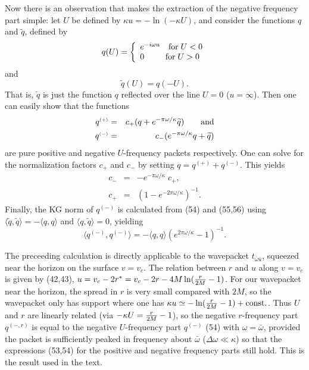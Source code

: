 \documentclass[12pt]{article}
\def\o{\omega}
\def\obar{\bar{\omega}}
\def\ubar{\bar{u}}
\def\la{\langle}
\def\ra{\rangle}
\begin{document}
Now there is an observation \cite{Notes,Wald75} that makes the
extraction of the negative frequency part simple: let
$U$ be defined by $\kappa u=-\ln(-\kappa U)$, and consider
the functions $q$ and $\widetilde q$, defined by
\begin{equation}
q(U)=\left\{
\begin{array}{l}
e^{-i\omega u} \quad {\rm for}\;  U<0\\
0\quad\quad\; \; {\rm for}\;  U>0
\end{array}\right.
\end{equation}
and
\begin{equation}\widetilde{q}(U)=q(-U).
\end{equation}
That is, $\widetilde q$ is just the function $q$ reflected over
the line $U=0$ ($u=\infty$). Then one can easily show that
the functions
\begin{eqnarray}
q^{\scriptscriptstyle(+)}&=&c_{+}
(q+e^{-\pi\o/\kappa}\widetilde{q})
\qquad {\rm and}\label{q+}\\
q^{\scriptscriptstyle(-)}&=&c_{-}
(e^{-\pi\o/\kappa}q+\widetilde{q})
\end{eqnarray}
are pure positive and negative $U$-frequency packets
respectively. One can solve for the normalization factors
$c_{+}$ and $c_{-}$ by setting
$q=q^{\scriptscriptstyle(+)}+q^{\scriptscriptstyle(-)}$.
This yields
\begin{eqnarray}
c_{-}&=&-e^{-\pi\o/\kappa}\; c_{+},\\
c_{+}&=&(1-e^{-2\pi\o/\kappa})^{-1}.
\end{eqnarray}
Finally, the KG norm of $q^{\scriptscriptstyle(-)}$ is
calculated from (54) and (55,56) using
$\la\widetilde{q},\widetilde{q}\ra=-\la q,q\ra$ and $\la
q,\widetilde{q}\ra=0$, yielding
\begin{equation}
\la q^{\scriptscriptstyle(-)},q^{\scriptscriptstyle(-)}\ra
=-\la q,q\ra (e^{2\pi\o/\kappa}-1)^{-1}.
\end{equation}

The preceeding calculation is directly applicable to the
wavepacket $t_{\obar\ubar}$, squeezed near the horizon on
the surface $v=v_c$.
The relation between $r$ and $u$ along $v=v_c$ is given by
(42,43), $u=v_c-2r^*=v_c-2r-4M\ln({r\over2M}-1)$. For our
wavepacket near the horizon, the spread in $r$ is very small
compared with $2M$, so the wavepacket only has support where
one has $\kappa u\simeq-\ln({r\over 2M}-1)+{\rm const.}$.
Thus $U$ and $r$ are linearly related
(via $-\kappa U={r\over 2M}-1$), so the negative $r$-frequency
part $q^{\scriptscriptstyle(-,r)}$ is equal to the negative
$U$-frequency part $q^{\scriptscriptstyle(-)}$ (54) with
$\o=\obar$, provided the packet is sufficiently peaked in
frequency about $\obar$ ($\Delta\o\ll\kappa$) so that the
expressions (53,54) for the positive and negative frequency
parts still hold.
This is the result used in the text.
\end{document}
